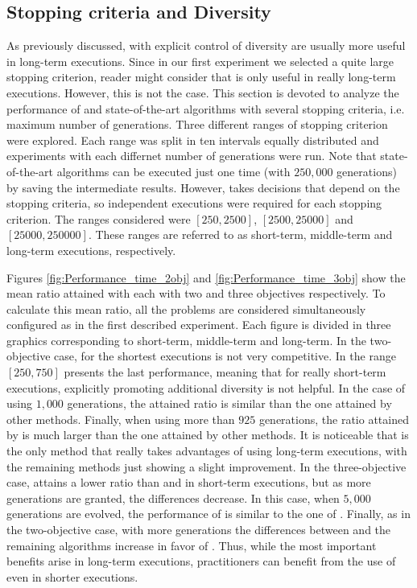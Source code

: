 \subsection{Stopping criteria and Diversity}

As previously discussed, \EAS{} with explicit control of diversity are usually more useful in long-term executions.
%
Since in our first experiment we selected a quite large stopping criterion, reader might consider that \VSDMOEA{} is only
useful in really long-term executions.
%
However, this is not the case.
%
This section is devoted to analyze the performance of \VSDMOEA{} and state-of-the-art algorithms with several stopping criteria, 
i.e. maximum number of generations.
%
Three different ranges of stopping criterion were explored.
%
Each range was split in ten intervals equally distributed and experiments with each differnet number of generations were run.
%
Note that state-of-the-art algorithms can be executed just one time (with $250,000$ generations) by saving the intermediate results.
%
However, \VSDMOEA{} takes decisions that depend on the stopping criteria, so independent executions were required for each stopping criterion.
%
The ranges considered were $[250, 2500]$, $[2500, 25000]$ and $[25000, 250000]$.
%
These ranges are referred to as short-term, middle-term and long-term executions, respectively.

Figures \ref{fig:Performance_time_2obj} and \ref{fig:Performance_time_3obj} show the mean \HV{} ratio attained with each \MOEA{} with two and three objectives respectively.
%
To calculate this mean ratio, all the problems are considered simultaneously configured as in the first described experiment.
%
Each figure is divided in three graphics corresponding to short-term, middle-term and long-term.
%
In the two-objective case, for the shortest executions \VSDMOEA{} is not very competitive.
%
In the range $[250, 750]$ presents the last performance, meaning that for really short-term executions,
explicitly promoting additional diversity is not helpful.
%
In the case of using $1,000$ generations, the attained \HV{} ratio is similar than the one attained by other methods.
%
Finally, when using more than $925$ generations, the \HV{} ratio attained by \VSDMOEA{} is much larger than the one
attained by other methods.
%
It is noticeable that \VSDMOEA{} is the only method that really takes advantages of using long-term executions,
with the remaining methods just showing a slight improvement.
%
In the three-objective case, \VSDMOEA{} attains a lower \HV{} ratio than \RMOEA{} and \MOEAD{} in short-term executions,
but as more generations are granted, the differences decrease.
%
In this case, when $5,000$ generations are evolved, the performance of \VSDMOEA{} is similar to the one of \RMOEA{}.
%
Finally, as in the two-objective case, with more generations the differences between \VSDMOEA{} and the remaining
algorithms increase in favor of \VSDMOEA{}.
%
Thus, while the most important benefits arise in long-term executions, practitioners can benefit from the use
of \VSDMOEA{} even in shorter executions.


